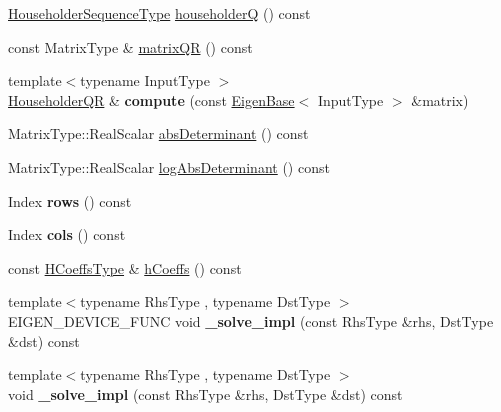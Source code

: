 \begin{DoxyCompactItemize}
\mbox{\hyperlink{class_eigen_1_1_householder_sequence}{Householder\+Sequence\+Type}} \mbox{\hyperlink{class_eigen_1_1_householder_q_r_affd506c10ef2d25f56e7b1f9f25ff885}{householderQ}} () const
\item 
const Matrix\+Type \& \mbox{\hyperlink{class_eigen_1_1_householder_q_r_ae837f2fb30099212c53b3042c7d699c9}{matrix\+QR}} () const
\item 
\mbox{\label{class_eigen_1_1_householder_q_r_aa8c555a962ee6fc24387696980d3068b}} 
{\footnotesize template$<$typename Input\+Type $>$ }\\\mbox{\hyperlink{class_eigen_1_1_householder_q_r}{Householder\+QR}} \& {\bfseries compute} (const \mbox{\hyperlink{struct_eigen_1_1_eigen_base}{Eigen\+Base}}$<$ Input\+Type $>$ \&matrix)
\item 
Matrix\+Type\+::\+Real\+Scalar \mbox{\hyperlink{class_eigen_1_1_householder_q_r_aaf4ef26c0b7affc91431ec59c92d64c3}{abs\+Determinant}} () const
\item 
Matrix\+Type\+::\+Real\+Scalar \mbox{\hyperlink{class_eigen_1_1_householder_q_r_af61b6dbef34fc51c825182b16dc43ca1}{log\+Abs\+Determinant}} () const
\item 
\mbox{\label{class_eigen_1_1_householder_q_r_aa5d8f6ec5fbedfdf0ec0d02459981e69}} 
Index {\bfseries rows} () const
\item 
\mbox{\label{class_eigen_1_1_householder_q_r_a2cd92da5485f0c4b79f39d7503e5c3f7}} 
Index {\bfseries cols} () const
\item 
const \mbox{\hyperlink{struct_eigen_1_1internal_1_1true__type}{H\+Coeffs\+Type}} \& \mbox{\hyperlink{class_eigen_1_1_householder_q_r_ae931aa44cde62317b57a9ae661d184be}{h\+Coeffs}} () const
\item 
\mbox{\label{class_eigen_1_1_householder_q_r_a33e033839ef123abf9768a686678abc0}} 
{\footnotesize template$<$typename Rhs\+Type , typename Dst\+Type $>$ }\\E\+I\+G\+E\+N\+\_\+\+D\+E\+V\+I\+C\+E\+\_\+\+F\+U\+NC void {\bfseries \+\_\+solve\+\_\+impl} (const Rhs\+Type \&rhs, Dst\+Type \&dst) const
\item 
\mbox{\label{class_eigen_1_1_householder_q_r_ade4806131aa604a7e767a276d99894e9}} 
{\footnotesize template$<$typename Rhs\+Type , typename Dst\+Type $>$ }\\void {\bfseries \+\_\+solve\+\_\+impl} (const Rhs\+Type \&rhs, Dst\+Type \&dst) const
\end{DoxyCompactItemize}
